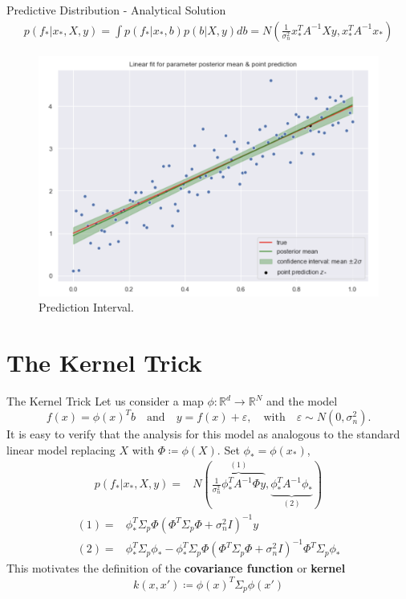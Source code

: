 \documentclass[10pt]{beamer}
\begin{document}
\begin{frame}{Predictive Distribution - Analytical Solution}{\cite[Chapter 2.1.1]{RW05}}
\begin{align*}
p(f_*|x_*, X, y) 
= \int p(f_*|x_*, b)p(b|X, y)db 
= N\left(
\frac{1}{\sigma_n^2}x_*^T A^{-1}Xy, x_*^T A^{-1}x_*
\right)
\end{align*}

\begin{center}
\begin{figure}
\includegraphics[scale=0.25]{images/lin_prediction.png} 
\caption{Prediction Interval.}
\end{figure}
\end{center}
\end{frame}


\section{The Kernel Trick}


\begin{frame}{The Kernel Trick}{\cite[Chapter 2.1.2]{RW05}}
Let us consider a map $\phi: \mathbb{R}^d \longrightarrow \mathbb{R}^N$ and the model
$$
f(x) = \phi(x)^T b \quad \text{and} \quad y = f(x) + \varepsilon, \quad \text{with} \quad \varepsilon \sim N(0, \sigma_n^2). 
$$
It is easy to verify that the analysis for this model as analogous to the standard linear model replacing $X$ with $\Phi\coloneqq \phi(X)$. Set $\phi_*= \phi(x_*)$, 
\begin{align*}
p(f_*|x_*, X, y) =& N\left(
\overbrace{\frac{1}{\sigma_n^2}\phi_*^T A^{-1}\Phi y}^{(1)},
\underbrace{ \phi_*^T A^{-1}\phi_*}_{(2)}
\right)
\end{align*}
\begin{align*}
(1) =& \phi_{*}^T \Sigma_{p}\Phi(\Phi^T \Sigma_p \Phi + \sigma_n^2I)^{-1}y \\
(2)= &\phi_{*}^T\Sigma_p\phi_{*} - \phi_{*}^T \Sigma_{p}\Phi(\Phi^T \Sigma_p \Phi + \sigma_n^2I)^{-1}\Phi^T\Sigma_p\phi_*
\end{align*}
\pause
This motivates the definition of the {\bf covariance function} or {\bf kernel}
$$
k(x, x')\coloneqq \phi(x)^T\Sigma_p\phi(x')
$$
\end{frame}
\end{document}
